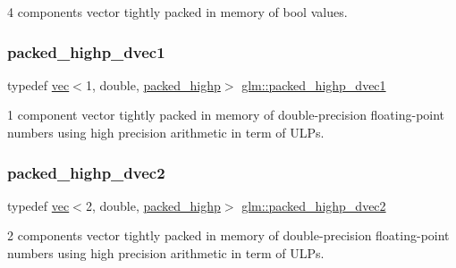 4 components vector tightly packed in memory of bool values. 

\mbox{\label{group__gtc__type__aligned_ga28333ae58dc1ce6fdf75a8dba0065603}} 
\subsubsection{\texorpdfstring{packed\+\_\+highp\+\_\+dvec1}{packed\_highp\_dvec1}}
{\footnotesize\ttfamily typedef \hyperlink{structglm_1_1vec}{vec}$<$1, double, \hyperlink{namespaceglm_a36ed105b07c7746804d7fdc7cc90ff25a8e8791ee77fe079b1291f710d88031bf}{packed\+\_\+highp}$>$ \hyperlink{group__gtc__type__aligned_ga28333ae58dc1ce6fdf75a8dba0065603}{glm\+::packed\+\_\+highp\+\_\+dvec1}}



1 component vector tightly packed in memory of double-\/precision floating-\/point numbers using high precision arithmetic in term of U\+L\+Ps. 

\mbox{\label{group__gtc__type__aligned_ga8c26414d99b8996aa7dc73e1dc8a06bd}} 
\subsubsection{\texorpdfstring{packed\+\_\+highp\+\_\+dvec2}{packed\_highp\_dvec2}}
{\footnotesize\ttfamily typedef \hyperlink{structglm_1_1vec}{vec}$<$2, double, \hyperlink{namespaceglm_a36ed105b07c7746804d7fdc7cc90ff25a8e8791ee77fe079b1291f710d88031bf}{packed\+\_\+highp}$>$ \hyperlink{group__gtc__type__aligned_ga8c26414d99b8996aa7dc73e1dc8a06bd}{glm\+::packed\+\_\+highp\+\_\+dvec2}}



2 components vector tightly packed in memory of double-\/precision floating-\/point numbers using high precision arithmetic in term of U\+L\+Ps. 

